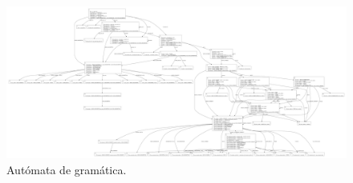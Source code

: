 \begin{figure}
    \centering
    \includegraphics[scale=0.13]{images/automata.pdf}
    \caption{Autómata de gramática.}
\end{figure}
